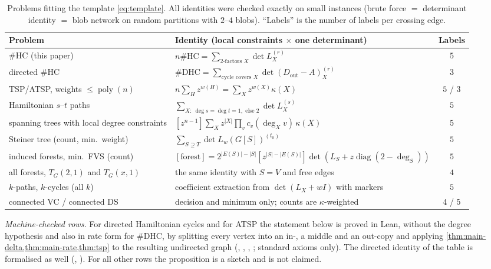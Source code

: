 \documentclass[11pt]{amsart}
\theoremstyle{plain}
\theoremstyle{definition}
\theoremstyle{remark}
\numberwithin{equation}{section}
\newcommand{\HC}{\#\mathrm{HC}}
\newcommand{\poly}{\operatorname{poly}}
\begin{document}
\begin{table}[ht]
\centering
\small
\caption{Problems fitting the template \eqref{eq:template}. All identities were checked exactly on
small instances (brute force $=$ determinant identity $=$ blob network on random partitions with
$2$--$4$ blobs). ``Labels'' is the number of labels per crossing edge.}\label{tab:extensions}
\begin{tabular}{@{}>{\raggedright\arraybackslash}p{4.6cm}>{\raggedright\arraybackslash}p{9.6cm}c@{}}
\toprule
Problem & Identity (local constraints $\times$ one determinant) & Labels \\
\midrule
$\HC$ (this paper) & $n\HC=\sum_{\text{2-factors }X}\det L_X^{(r)}$ & $5$\\
directed $\HC$ & $\#\mathrm{DHC}=\sum_{\text{cycle covers }X}\det(D_{\mathrm{out}}-A)_X^{(r)}$ & $3$\\
TSP/ATSP, weights $\le\poly(n)$ & $n\sum_Hz^{w(H)}=\sum_Xz^{w(X)}\kappa(X)$ & $5$ / $3$\\
Hamiltonian $s$--$t$ paths & $\sum_{X:\ \deg s=\deg t=1,\text{ else }2}\det L_X^{(s)}$ & $5$\\
spanning trees with local degree constraints & $[z^{n-1}]\sum_Xz^{|X|}\prod_vc_v(\deg_Xv)\,\kappa(X)$ & $5$\\
Steiner tree (count, min.\ weight) & $\sum_{S\supseteq T}\det L_w(G[S])^{(t_0)}$ & $5$\\
induced forests, min.\ FVS (count) & $[\text{forest}]=2^{|E(S)|-|S|}[z^{|S|-|E(S)|}]\det(L_S+z\operatorname{diag}(2-\deg_S))$ & $5$\\
all forests, $T_G(2,1)$ and $T_G(x,1)$ & the same identity with $S=V$ and free edges & $4$\\
$k$-paths, $k$-cycles (all $k$) & coefficient extraction from $\det(L_X+wI)$ with markers & $5$\\
connected VC / connected DS & decision and minimum only; counts are $\kappa$-weighted & $4$ / $5$\\
\bottomrule
\end{tabular}
\end{table}

\noindent\emph{Machine-checked rows.} For directed Hamiltonian cycles and for ATSP the statement below
is proved in Lean, without the degree hypothesis and also in rate form for $\#\mathrm{DHC}$, by
splitting every vertex into an in-, a middle and an out-copy and applying
\cref{thm:main-delta,thm:main-rate,thm:tsp} to the resulting undirected graph (,
, , ; standard axioms only). The
directed identity of the table is formalised as well (,
). For all other rows the proposition is a sketch and is not claimed.
\end{document}
